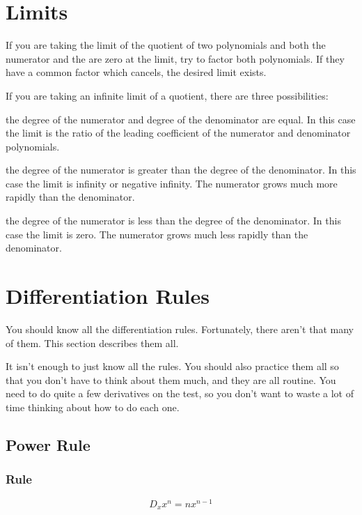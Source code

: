 \documentclass[fleqn]{article}
\begin{document}
\section{Limits}
If you are taking the limit of the quotient of two polynomials and both the numerator and the are zero at the limit, try
to factor both polynomials.  If they have a common factor which cancels, the desired limit exists.

If you are taking an infinite limit of a quotient, there are three possibilities:
\begin{itemize*}
  \item the degree of the numerator and degree of the denominator are equal.  In this case the limit is the ratio of the
    leading coefficient of the numerator and denominator polynomials.
  \item the degree of the numerator is greater than the degree of the denominator.  In this case the limit is infinity
    or negative infinity.  The numerator grows much more rapidly than the denominator.

  \item the degree of the numerator is less than the degree of the denominator.  In this case the limit is zero.
    The numerator grows much less rapidly than the denominator.
\end{itemize*}

\section{Differentiation Rules}

You should know all the differentiation rules.  Fortunately, there aren't that many of them.  This section describes
them all.

It isn't enough to just know all the rules.  You should also practice them all so that you don't have to think about
them much, and they are all routine.  You need to do quite a few derivatives on the test, so you don't want to waste a
lot of time thinking about how to do each one.

\subsection{Power Rule}

\subsubsection{Rule}
\[
  D_x x^n = n x^{n - 1}
\]
\end{document}
